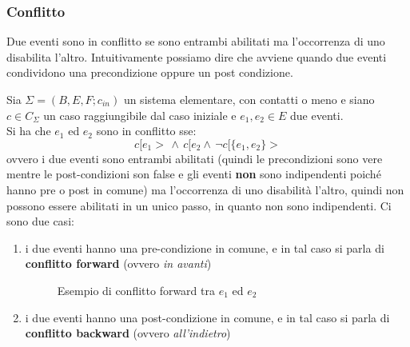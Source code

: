 \subsubsection{Conflitto}
Due eventi sono in conflitto se sono entrambi abilitati ma l’occorrenza di uno
disabilita l’altro. Intuitivamente possiamo dire che avviene quando due eventi condividono una
precondizione oppure un post condizione.
\begin{definizione}
  Sia $\Sigma = (B, E, F;c_{in})$ un sistema elementare, con contatti o meno
  e siano $c\in C_\Sigma$ un caso raggiungibile dal caso iniziale e $e_1, e_2\in
  E$ due eventi.\\
  Si ha che $e_1$ ed $e_2$ sono in conflitto sse:
  \[c[e_1>\,\wedge\, c[e_2 \wedge\,\neg c[\{e_1, e_2\}>\]
  ovvero i due eventi sono entrambi abilitati (quindi le precondizioni sono vere
  mentre le post-condizioni son false e gli eventi \textbf{non} sono indipendenti poiché hanno pre o post in comune) ma l'occorrenza di uno disabilità
  l'altro, quindi non possono essere abilitati in un unico passo, in quanto non
  sono indipendenti. Ci sono due casi:
  \begin{enumerate}
    \item i due eventi hanno una pre-condizione in comune, e in tal caso si parla
    di \textbf{conflitto forward} (ovvero \textit{in avanti})
    \begin{figure}[H]
      \centering
      \caption{Esempio di conflitto forward tra $e_1$ ed $e_2$}
    \end{figure}
    \item i due eventi hanno una post-condizione in comune, e in tal caso si parla
    di \textbf{conflitto backward} (ovvero \textit{all'indietro})
    \begin{figure}[H]
      \centering
\end{figure}
\end{enumerate}
\end{definizione}

